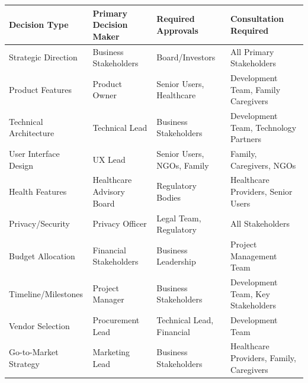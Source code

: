 \documentclass[
  letterpaper,
  DIV=11,
  numbers=noendperiod]{scrartcl}
\begin{document}
\begin{longtable}[]{@{}
  >{\raggedright\arraybackslash}p{}
  >{\raggedright\arraybackslash}p{}
  >{\raggedright\arraybackslash}p{}
  >{\raggedright\arraybackslash}p{}@{}}
\toprule\noalign{}
\begin{minipage}[b]{\linewidth}\raggedright
Decision Type
\end{minipage} & \begin{minipage}[b]{\linewidth}\raggedright
Primary Decision Maker
\end{minipage} & \begin{minipage}[b]{\linewidth}\raggedright
Required Approvals
\end{minipage} & \begin{minipage}[b]{\linewidth}\raggedright
Consultation Required
\end{minipage} \\
\midrule\noalign{}
\endhead
\bottomrule\noalign{}
\endlastfoot
Strategic Direction & Business Stakeholders & Board/Investors & All
Primary Stakeholders \\
Product Features & Product Owner & Senior Users, Healthcare &
Development Team, Family Caregivers \\
Technical Architecture & Technical Lead & Business Stakeholders &
Development Team, Technology Partners \\
User Interface Design & UX Lead & Senior Users, NGOs, Family & Family,
Caregivers, NGOs \\
Health Features & Healthcare Advisory Board & Regulatory Bodies &
Healthcare Providers, Senior Users \\
Privacy/Security & Privacy Officer & Legal Team, Regulatory & All
Stakeholders \\
Budget Allocation & Financial Stakeholders & Business Leadership &
Project Management Team \\
Timeline/Milestones & Project Manager & Business Stakeholders &
Development Team, Key Stakeholders \\
Vendor Selection & Procurement Lead & Technical Lead, Financial &
Development Team \\
Go-to-Market Strategy & Marketing Lead & Business Stakeholders &
Healthcare Providers, Family, Caregivers \\
\end{longtable}
\end{document}
